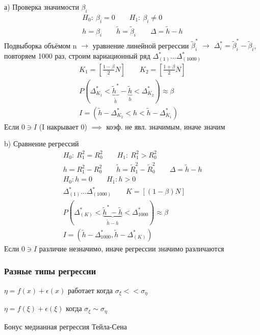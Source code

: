 \documentclass{article}
\begin{document}
\hr
а) Проверка значимости $\beta_i$
\begin{gather*}
  H_0:\: \beta_i = 0 \qquad H_1: \: \beta_i\neq0 \\ 
  h=\beta_i \qquad \tilde{h}=\tilde{\beta}_i \qquad \Delta = \tilde{h}-h
\end{gather*}
Подвыборка объёмом n $\rightarrow$ уравнение линейной регрессии $\tilde{\beta}_i^{*}$ $\rightarrow$ $\Delta_i^{*}=\tilde{\beta}_i^{*}-\tilde{\beta}_i$,
повторяем 1000 раз, строим вариационный ряд $\Delta_{(1)}^{*}\dots \Delta_{(10 0 0)}^{*}$
\begin{gather*}
  K_1=[\frac{1-\beta}{2}N] \qquad K_2 = [\frac{1+\beta}{2}N] \\ 
  P(\Delta_{K_1}^{*} < \underbrace{\tilde{h}^{*}}_{\tilde{h}}-\underbrace{\tilde{h}}_{h} < \Delta_{K_2}^{*}) \approx \beta \\ 
  I = (\tilde{h}-\Delta_{K_2}^{*} < h < \tilde{h} - \Delta_{K_1}^{*})
\end{gather*}
Если $0 \ni I$ (I накрывает 0) $\implies$ коэф. не явл. значимым, иначе значим

\hr 
b) Сравнение регрессий
\begin{gather*}
  H_0:\: R^{2}_1 = R_0^{2} \qquad H_1: \: R_1^{2}>R_0^{2} \\ 
  h = R_1^{2}-R_0^{2} \qquad \tilde{h}=\tilde{R}_1^{2}-\tilde{R}_0^{2} \qquad \Delta = \tilde{h}-h \\ 
  H_0: h =0 \qquad H_1: h > 0 \\
  \Delta_{(1)}^{*}\dots \Delta_{(10 0 0)}^{*} \qquad K=[(1-\beta)N] \\ 
P(\Delta_{(K)}^{*} < \underbrace{\tilde{h}^{*}-\tilde{h}}_{\tilde{h}-h} < \Delta_{10 0 0}^{*}) \approx \beta \\ 
I=(\tilde{h}-\Delta_{100 0}^{*}, \tilde{h}-\Delta_{(K)}^{*})
\end{gather*}
Если $0 \ni I$ различие незначимо, иначе регрессии значимо различаются

\subsubsection{Разные типы регрессии}
$\eta=f(x) + \epsilon(x)$ работает когда $\sigma_\xi << \sigma_{\eta}$

$\eta=f(\xi)+\epsilon(\xi)$ когда $\sigma_{\xi}\sim \sigma_\eta$

Бонус медианная регрессия Тейла-Сена
\end{document}
